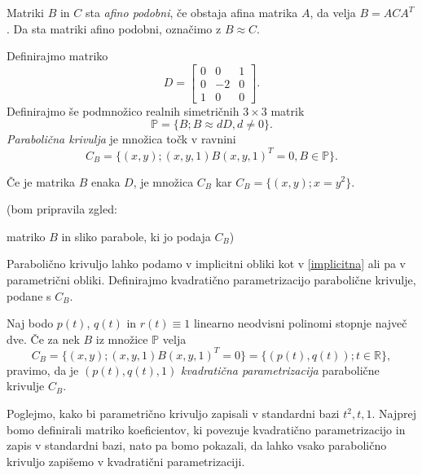 \documentclass[mat1]{fmfdelo}
\newcommand{\R}{\mathbb R}
\newcommand{\PP}{\mathbb P}
\begin{document}
\begin{definicija}
Matriki $B$ in $C$ sta \emph{afino podobni}, če obstaja afina matrika $A$, da velja $B = A C A^{T}$.
Da sta matriki afino podobni, označimo z $B \approx C$.
\end{definicija}


\begin{definicija}\label{prva}
Definirajmo matriko 
$$D = 
\begin{bmatrix}
0 & 0 & 1 \\
0 & -2 & 0 \\
1 & 0 & 0
\end{bmatrix}.
$$
Definirajmo še podmnožico realnih simetričnih $3 \times 3$ matrik $$\PP = \{ B; B \approx d D, d \neq 0 \} .$$
\emph{Parabolična krivulja} je množica točk v ravnini 
\begin{equation}\label{implicitna}
 C_B = \{ (x,y); (x,y,1) B (x, y, 1)^T = 0, B \in \PP \}.
 \end{equation}
\end{definicija}

Če je matrika $B$ enaka $D$, je množica $C_B$ kar $C_B = \{ (x,y); x = y^2 \}$.

\begin{zgled}

(bom pripravila zgled: 

matriko $B$ in sliko parabole, ki jo podaja $C_B$)

\end{zgled}

Parabolično krivuljo lahko podamo v implicitni obliki kot v \eqref{implicitna} ali pa v parametrični obliki. Definirajmo kvadratično parametrizacijo parabolične krivulje, podane s $C_B$.

\begin{definicija}
Naj bodo $p(t)$, $q(t)$ in $r(t) \equiv 1$ linearno neodvisni polinomi stopnje največ dve. Če za nek $B$ iz množice $\PP$ velja 
$$ C_B = \{ (x,y); (x,y,1) B (x, y, 1)^T = 0 \} = \{ (p(t), q(t)); t \in \R \},$$
pravimo, da je $( p(t), q(t), 1)$ \emph{kvadratična parametrizacija} parabolične krivulje $C_B$.
\end{definicija}

Poglejmo, kako bi parametrično krivuljo zapisali v standardni bazi $t^2, t, 1$. Najprej bomo definirali matriko koeficientov, ki povezuje kvadratično parametrizacijo in zapis v standardni bazi, nato pa bomo pokazali, da lahko vsako parabolično krivuljo zapišemo v kvadratični parametrizaciji.
\end{document}
